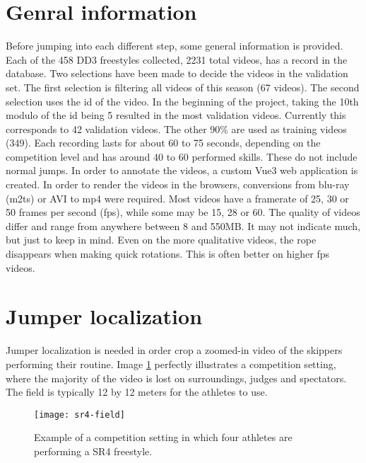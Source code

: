 
\section{Genral information}

Before jumping into each different step, some general information is provided. Each of the 458 DD3 freestyles collected, 2231 total videos, has a record in the database. Two selections have been made to decide the videos in the validation set. The first selection is filtering all videos of this season (67 videos). The second selection uses the id of the video. In the beginning of the project, taking the 10th modulo of the id being 5 resulted in the most validation videos. Currently this corresponds to 42 validation videos. The other 90\% are used as training videos (349).
Each recording lasts for about 60 to 75 seconds, depending on the competition level and has around 40 to 60 performed skills. These do not include normal jumps. In order to annotate the videos, a custom Vue3 web application is created. In order to render the videos in the browsers, conversions from blu-ray (m2ts) or AVI to mp4 were required. Most videos have a framerate of 25, 30 or 50 frames per second (fps), while some may be 15, 28 or 60.
The quality of videos differ and range from anywhere between 8 and 550MB. It may not indicate much, but just to keep in mind. Even on the more qualitative videos, the rope disappears when making quick rotations. This is often better on higher fps videos.

\section{Jumper localization}
\label{methodology:jumper-localization}

Jumper localization is needed in order crop a zoomed-in video of the skippers performing their routine. Image \ref{fig:sr4-field} perfectly illustrates a competition setting, where the majority of the video is lost on surroundings, judges and spectators. The field is typically 12 by 12 meters for the athletes to use.

\begin{figure}
    \centering
    \texttt{[image: sr4-field]}
    \caption[Example jump rope competition setting]{Example of a competition setting in which four athletes are performing a SR4 freestyle.}
    \label{fig:sr4-field}
\end{figure}


